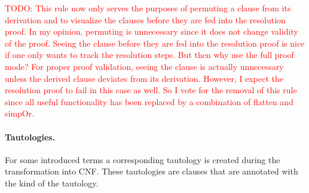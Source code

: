 \documentclass[a4paper]{article}
\newcommand\todo[1]{\textcolor{red}{TODO: #1}}
\begin{document}
\todo{This rule now only serves the purposes of permuting a clause from its
  derivation and to visualize the clauses before they are fed into the
  resolution proof.  In my opinion, permuting is unnecessary since it does not
  change validity of the proof.  Seeing the clause before they are fed into
  the resolution proof is nice if one only wants to track the resolution
  steps.  But then why use the full proof mode?  For proper proof validation,
  seeing the clause is actually unnecessary unless the derived clause deviates
  from its derivation.  However, I expect the resolution proof to fail in this
  case as well.  So I vote for the removal of this rule since all useful
  functionality has been replaced by a combination of flatten and simpOr.}

\paragraph{Tautologies.}  For some introduced terms a corresponding tautology
is created during the transformation into CNF.  These tautologies are
clauses that are annotated with the kind of the tautology.  
\end{document}
